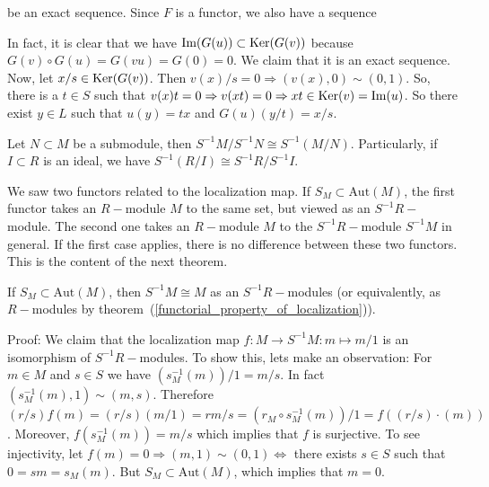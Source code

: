 \begin{center}
\end{center}
be an exact sequence. Since $F$ is a functor, we also have a sequence
\begin{center}
\end{center}
In fact, it is clear that we have $\text{Im}(G(u)) \subset\text{Ker}(G(v))$ because $G(v)\circ G(u)=G(vu)=G(0)=0$. We claim that it is an exact sequence. Now, let $x/s\in\text{Ker}(G(v))$. Then $v(x)/s=0\Rightarrow(v(x),0)\sim (0,1)$. So, there is a $t\in S$ such that $v(x)t=0\Rightarrow v(xt)=0\Rightarrow xt\in\text{Ker}(v)=\text{Im}(u)$. So there exist $y\in L$ such that $u(y)=tx$ and $G(u)(y/t)=x/s$.
\begin{dang}
    \begin{corollary}\label{localization of a quotient if the quotient of localizations}
        Let $N\subset M$ be a submodule, then $S^{-1}M/S^{-1}N\cong S^{-1}(M/N)$. Particularly, if $I\subset R$ is an ideal, we have $S^{-1}(R/I)\cong S^{-1}R/S^{-1}I$. 
    \end{corollary}
\end{dang}
We saw two functors related to the localization map. If $S_M\subset\text{Aut}(M)$, the first functor takes an $R-$module $M$ to the same set, but viewed as an $S^{-1}R-$module. The second one takes an $R-$module $M$ to the $S^{-1}R-$module $S^{-1}M$ in general. If the first case applies, there is no difference between these two functors. This is the content of the next theorem.
\begin{dang}
    \begin{theorem}\label{localization_does_not_change_the_module}
        If $S_M\subset \text{Aut}(M)$, then $S^{-1}M\cong M$ as an $S^{-1}R-$modules (or equivalently, as $R-$modules by theorem~(\ref{functorial_property_of_localization})).
    \end{theorem}
\end{dang}
Proof: We claim that the localization map $f:M\rightarrow S^{-1}M:m\mapsto m/1$ is an isomorphism of $S^{-1}R-$modules. To show this, lets make an observation: For $m\in M$ and $s\in S$ we have $(s_M^{-1}(m))/1=m/s$. In fact $(s_M^{-1}(m),1)\sim(m,s)$. Therefore $(r/s)f(m)=(r/s)(m/1)=rm/s=(r_M\circ s_M^{-1}(m))/1=f((r/s)\cdot(m))$. Moreover, $f(s_M^{-1}(m))=m/s$ which implies that $f$ is surjective. To see injectivity, let $f(m)=0\Rightarrow (m,1)\sim(0,1)\iff$ 
there exists $s\in S$ such that $0=sm=s_M(m)$. But $S_M\subset \text{Aut}(M)$, which implies that $m=0$.  

